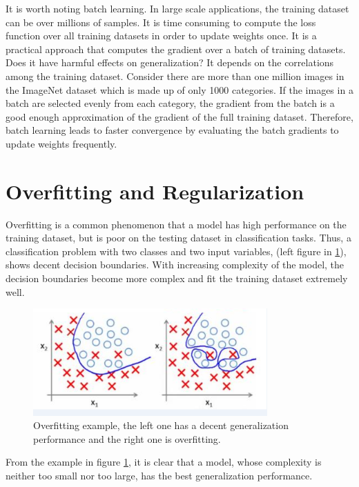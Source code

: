 It is worth noting batch learning. In large scale applications, the training dataset can be over millions of samples. It is time consuming to compute the loss function over all training datasets in order to update weights once. It is a practical approach that computes the gradient over a batch of training datasets. Does it have harmful effects on generalization? It depends on the correlations among the training dataset. Consider there are more than one million images in the ImageNet dataset which is made up of only 1000 categories. If the images in a batch are selected evenly from each category, the gradient from the batch is a good enough approximation of the gradient of the full training dataset. Therefore, batch learning leads to faster convergence by evaluating the batch gradients to update weights frequently.

\section{Overfitting and Regularization}

Overfitting is a common phenomenon that a model has high performance on the training dataset, but is poor on the testing dataset in classification tasks. Thus, a classification problem with two classes and two input variables, (left figure in \ref{fig:OverfittingExample}), shows decent decision boundaries. With increasing complexity of the model, the decision boundaries become more complex and fit the training dataset extremely well.
\graphicspath{ {./Figures/} }
\begin{figure}[!htb]
\centering
\includegraphics[width=0.8\textwidth]{overfitting.png}
\caption{\label{fig:OverfittingExample}Overfitting example, the left one has a decent generalization performance and the right one is overfitting\citep{OverfittingFigure}.}
\end{figure}
From the example in figure \ref{fig:OverfittingExample}, it is clear that a model, whose complexity is neither too small nor too large, has the best generalization performance. 

